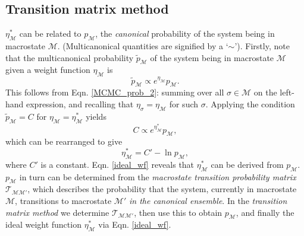 \documentclass{report}
\begin{document}
\subsection{Transition matrix method}\label{sec:transition_matrix}
$\eta_{\mathcal{M}}^*$ can be related to $p_{\mathcal{M}}$, the \emph{canonical} probability of the system being in macrostate $\mathcal{M}$. (Multicanonical
quantities are signified by a `$\sim$'). Firstly, note that the multicanonical probability $\tilde{p}_{\mathcal{M}}$ of the system being in macrostate 
$\mathcal{M}$ given a weight function $\eta_{\mathcal{M}}$ is
\begin{equation}
\tilde{p}_{\mathcal{M}}\propto e^{\eta_{\mathcal{M}}}p_{\mathcal{M}}.
\end{equation}
This follows from Eqn. \eqref{MCMC_prob_2}: summing over all $\sigma\in\mathcal{M}$ on the left-hand expression, and recalling that 
$\eta_{\sigma}=\eta_{\mathcal{M}}$ for such $\sigma$. Applying the condition $\tilde{p}_{\mathcal{M}}=C$ for $\eta_{\mathcal{M}}=\eta_{\mathcal{M}}^*$ yields
\begin{equation}
C\propto e^{\eta^*_{\mathcal{M}}}p_{\mathcal{M}},
\end{equation}
which can be rearranged to give
\begin{equation}\label{ideal_wf}
\eta^*_{\mathcal{M}}=C'-\ln p_{\mathcal{M}},
\end{equation}
where $C'$ is a constant. Eqn. \eqref{ideal_wf} reveals that $\eta^*_{\mathcal{M}}$ can be derived from $p_{\mathcal{M}}$. $p_{\mathcal{M}}$ 
in turn can be determined from the \emph{macrostate transition probability matrix} $\mathcal{T}_{\mathcal{MM}'}$, which describes the probability that
the system, currently in macrostate $\mathcal{M}$, transitions to macrostate $\mathcal{M}'$ \emph{in the canonical ensemble}.
In the \emph{transition matrix method} \cite{Smith_1995,Fitzgerald_1999} we determine $\mathcal{T}_{\mathcal{MM}'}$, then use this to obtain
$p_{\mathcal{M}}$, and finally the ideal weight function $\eta_{\mathcal{M}}^*$ via Eqn. \eqref{ideal_wf}.
\end{document}
